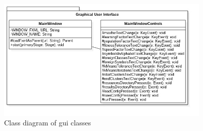 \documentclass{mini}
\begin{document}
\begin{figure}[H]
    \centering
    \includegraphics[width=0.9\textwidth]{images/gui.jpg}
    \caption{Class diagram of gui classes}
    \label{fig:gui_classes}
\end{figure}
\end{document}
